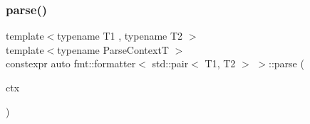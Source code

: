 \mbox{\label{structfmt_1_1formatter_3_01std_1_1pair_3_01_t1_00_01_t2_01_4_01_4_ac5fc19d6b6aea0133abb1f03c7158b76}} 
\subsubsection{\texorpdfstring{parse()}{parse()}}
{\footnotesize\ttfamily template$<$typename T1 , typename T2 $>$ \\
template$<$typename Parse\+ContextT $>$ \\
constexpr auto fmt\+::formatter$<$ std\+::pair$<$ T1, T2 $>$ $>$\+::parse (\begin{DoxyParamCaption}\item[{Parse\+ContextT \&}]{ctx }\end{DoxyParamCaption})}

